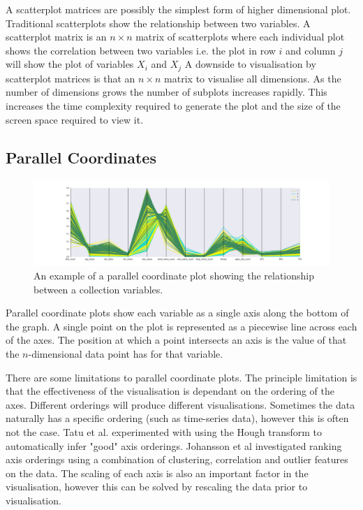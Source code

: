 A scatterplot matrices are possibly the simplest form of higher dimensional plot. Traditional scatterplots show the relationship between two variables. A scatterplot matrix is an $n \times n$ matrix of scatterplots where each individual plot shows the correlation between two variables i.e. the plot in row $i$ and column $j$ will show the plot of variables $X_i$ and $X_j$  A downside to visualisation by scatterplot matrices is that an $n \times n$ matrix to visualise all dimensions. As the number of dimensions grows the number of subplots increases rapidly. This increases the time complexity required to generate the plot and the size of the screen space required to view it.

\subsection{Parallel Coordinates}

\begin{figure}[H]
	\label{fig:parallel-coords-plot}
	\centering
	\includegraphics[width=1.0\textwidth]{Images/parallel-coords-plot.png}	
	\caption{An example of a parallel coordinate plot showing the relationship between a collection variables.}
\end{figure}

Parallel coordinate plots \cite{inselberg1991parallel} show each variable as a single axis along the bottom of the graph. A single point on the plot is represented as a piecewise line across each of the axes. The position at which a point intersects an axis is the value of that the $n$-dimensional data point has for that variable.

There are some limitations to parallel coordinate plots. The principle limitation is that the effectiveness of the visualisation is dependant on the ordering of the axes. Different orderings will produce different visualisations. Sometimes the data naturally has a specific ordering (such as time-series data), however this is often not the case. Tatu et al. \cite{tatu2009combining} experimented with using the Hough transform to automatically infer "good" axis orderings. Johansson et al \cite{johansson2009interactive} investigated ranking axis orderings using a combination of clustering, correlation and outlier features on the data. The scaling of each axis is also an important factor in the visualisation, however this can be solved by rescaling the data prior to visualisation.

